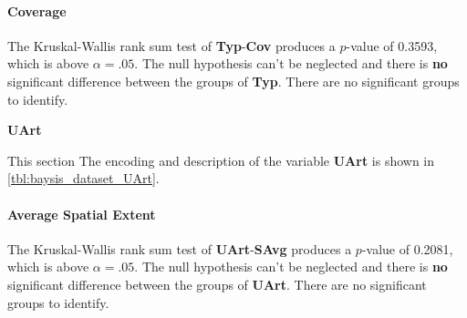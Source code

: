 \paragraph{Coverage}
The Kruskal-Wallis rank sum test of \textbf{Typ}-\textbf{Cov} produces a $p$-value of 0.3593, which is above $\alpha=.05$. The null hypothesis can't be neglected and there is \textbf{no} significant difference between the groups of \textbf{Typ}. There are no significant groups to identify.

\Large
\centerline{\textbf{UArt}}
\normalsize
This section
The encoding and description of the variable \textbf{UArt} is shown in \autoref{tbl:baysis_dataset_UArt}. 

\paragraph{Average Spatial Extent}
The Kruskal-Wallis rank sum test of \textbf{UArt}-\textbf{SAvg} produces a $p$-value of 0.2081, which is above $\alpha=.05$. The null hypothesis can't be neglected and there is \textbf{no} significant difference between the groups of \textbf{UArt}. There are no significant groups to identify.

